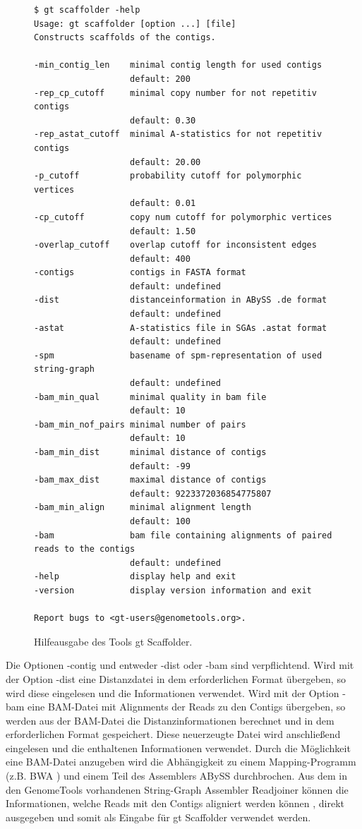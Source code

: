 \documentclass[a4paper,10pt,parskip]{scrartcl}
\begin{document}
\begin{figure}
\begin{verbatim}
$ gt scaffolder -help
Usage: gt scaffolder [option ...] [file]
Constructs scaffolds of the contigs.

-min_contig_len    minimal contig length for used contigs
                   default: 200
-rep_cp_cutoff     minimal copy number for not repetitiv contigs
                   default: 0.30
-rep_astat_cutoff  minimal A-statistics for not repetitiv contigs
                   default: 20.00
-p_cutoff          probability cutoff for polymorphic vertices
                   default: 0.01
-cp_cutoff         copy num cutoff for polymorphic vertices
                   default: 1.50
-overlap_cutoff    overlap cutoff for inconsistent edges
                   default: 400
-contigs           contigs in FASTA format
                   default: undefined
-dist              distanceinformation in ABySS .de format
                   default: undefined
-astat             A-statistics file in SGAs .astat format
                   default: undefined
-spm               basename of spm-representation of used string-graph
                   default: undefined
-bam_min_qual      minimal quality in bam file
                   default: 10
-bam_min_nof_pairs minimal number of pairs
                   default: 10
-bam_min_dist      minimal distance of contigs
                   default: -99
-bam_max_dist      maximal distance of contigs
                   default: 9223372036854775807
-bam_min_align     minimal alignment length
                   default: 100
-bam               bam file containing alignments of paired reads to the contigs
                   default: undefined
-help              display help and exit
-version           display version information and exit

Report bugs to <gt-users@genometools.org>.
\end{verbatim}
\caption{\label{abb: help}Hilfeausgabe des Tools gt Scaffolder.}
\end{figure}

Die Optionen -contig und entweder -dist oder -bam sind
verpflichtend. Wird mit der Option -dist eine Distanzdatei in dem
erforderlichen Format übergeben, so wird diese eingelesen und die
Informationen verwendet. Wird mit der Option -bam eine BAM-Datei mit
Alignments der Reads zu den Contigs übergeben, so werden aus der
BAM-Datei die Distanzinformationen berechnet und in dem erforderlichen
Format gespeichert. Diese neuerzeugte Datei wird anschließend
eingelesen und die enthaltenen Informationen verwendet. Durch die
Möglichkeit eine BAM-Datei anzugeben wird die Abhängigkeit zu einem
Mapping-Programm (z.B. BWA ) und einem Teil des
Assemblers ABySS  durchbrochen. Aus dem in den
GenomeTools vorhandenen String-Graph Assembler Readjoiner können die
Informationen, welche Reads mit den Contigs aligniert werden können ,
direkt ausgegeben und somit als Eingabe für gt Scaffolder verwendet
werden.
\end{document}
